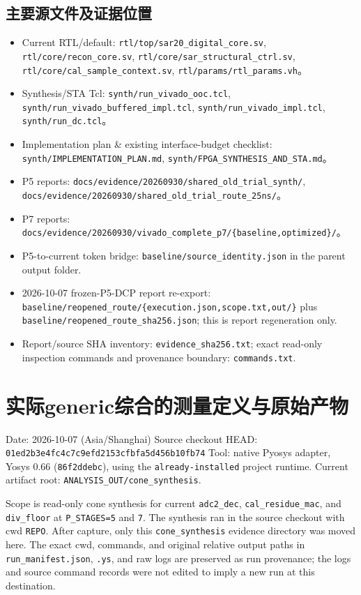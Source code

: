 \documentclass[UTF8,fontset=fandol,10pt,a4paper,openany]{ctexrep}
\newcommand{\code}[1]{\nolinkurl{#1}}
\begin{document}
\section{主要源文件及证据位置}
\begingroup\small


\begin{itemize}
\item Current RTL/default: \code{rtl/top/sar20_digital_core.sv}, \code{rtl/core/recon_core.sv}, \code{rtl/core/sar_structural_ctrl.sv}, \code{rtl/core/cal_sample_context.sv}, \code{rtl/params/rtl_params.vh}。
\item Synthesis/STA Tcl: \code{synth/run_vivado_ooc.tcl}, \code{synth/run_vivado_buffered_impl.tcl}, \code{synth/run_vivado_impl.tcl}, \code{synth/run_dc.tcl}。
\item Implementation plan \& existing interface-budget checklist: \code{synth/IMPLEMENTATION_PLAN.md}, \code{synth/FPGA_SYNTHESIS_AND_STA.md}。
\item P5 reports: \code{docs/evidence/20260930/shared_old_trial_synth/}, \code{docs/evidence/20260930/shared_old_trial_route_25ns/}。
\item P7 reports: \texttt{\code{docs/evidence/20260930/vivado_complete_p7/}\{\code{baseline,optimized}\}/}。
\item P5-to-current token bridge: \code{baseline/source_identity.json} in the parent output folder.
\item 2026-10-07 frozen-P5-DCP report re-export: \texttt{\code{baseline/reopened_route/}\{\code{execution.json,scope.txt,out/}\}} plus \code{baseline/reopened_route_sha256.json}; this is report regeneration only.
\item Report/source SHA inventory: \code{evidence_sha256.txt}; exact read-only inspection commands and provenance boundary: \code{commands.txt}.
\end{itemize}
\endgroup
\chapter{实际generic综合的测量定义与原始产物}
\begingroup\small


Date: 2026-10-07 (Asia/Shanghai)
Source checkout HEAD: \code{01ed2b3e4fc4c7c9efd2153cfbfa5d456b10fb74}
Tool: native Pyosys adapter, Yosys 0.66 (\code{86f2ddebc}), using the \code{already-installed} project runtime.
Current artifact root: \code{ANALYSIS_OUT/cone_synthesis}.


Scope is read-only cone synthesis for current \code{adc2_dec}, \code{cal_residue_mac}, and \code{div_floor} at \code{P_STAGES=5} and \code{7}. The synthesis ran in the source checkout with cwd \code{REPO}. After capture, only this \code{cone_synthesis} evidence directory was moved here. The exact cwd, commands, and original relative output paths in \code{run_manifest.json}, \code{.ys}, and raw logs are preserved as run provenance; the logs and source command records were not edited to imply a new run at this destination.
\end{document}
